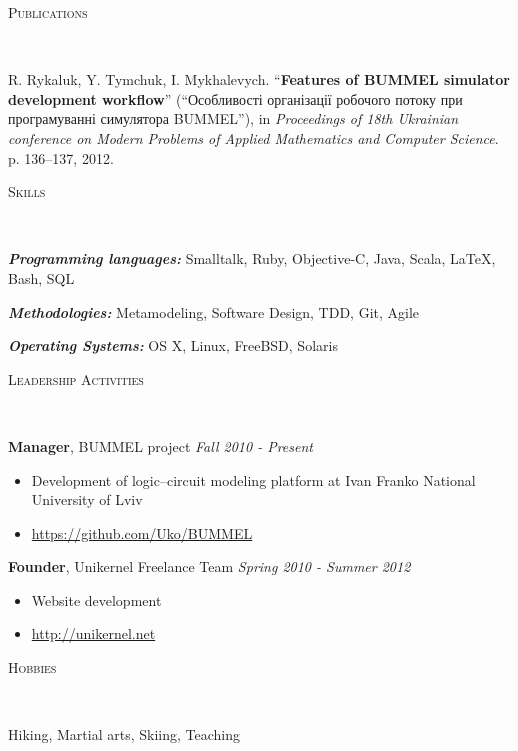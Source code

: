 \documentclass{article}
\newenvironment{changemargin}[2]{%
  \begin{list}{}{%
    \setlength{\topsep}{0pt}%
    \setlength{\leftmargin}{#1}%
    \setlength{\rightmargin}{#2}%
    \setlength{\listparindent}{\parindent}%
    \setlength{\itemindent}{\parindent}%
    \setlength{\parsep}{\parskip}%
  }%
  \item[]}{\end{list}
}
\newcommand{\lineover}{
  \begin{changemargin}{-1mm}{-1mm}
    \vspace*{-8pt}
    \hrulefill \\
    \vspace*{-2pt}
  \end{changemargin}
}
\newcommand{\header}[1]{
  \begin{changemargin}{-12mm}{-12mm}
    \scshape{#1}\\
    \lineover
  \end{changemargin}
}
\newenvironment{body}{
  \vspace*{-16pt}
  \begin{changemargin}{-6mm}{-12mm}
}{
  \end{changemargin}
}
\begin{document}
\smallskip

\header{Publications}

\begin{body}
  \vspace{14pt}
  R. Rykaluk, Y. Tymchuk, I. Mykhalevych. ``\textbf{Features of BUMMEL simulator development workflow}'' (``Особливості організації робочого потоку при програмуванні симулятора BUMMEL''), in \emph{Proceedings of 18th Ukrainian conference on Modern Problems of Applied Mathematics and Computer Science}. p. 136--137, 2012.\\

\end{body}

\smallskip

\header{Skills}

\begin{body}
  \vspace{14pt}
  \emph{\textbf{Programming languages:}}{} Smalltalk, Ruby, Objective-C, Java, Scala, \LaTeX, Bash, SQL
  \medskip
  
  \emph{\textbf{Methodologies:}}{} Metamodeling, Software Design, TDD, Git, Agile
  \medskip
  
  \emph{\textbf{Operating Systems:}}{} OS X, Linux, FreeBSD, Solaris
\end{body}

\smallskip


\header{Leadership Activities}

\begin{body}
  \vspace{14pt}
  \textbf{Manager}, BUMMEL project \hfill{} \emph{Fall 2010 - Present}\\
  \vspace*{-4pt}
  \begin{itemize} \itemsep -0pt
    \item Development of logic--circuit modeling platform at Ivan Franko National University of Lviv 
    \item \url{https://github.com/Uko/BUMMEL}
  \end{itemize}
  \smallskip
  \textbf{Founder}, Unikernel Freelance Team \hfill {} \emph{Spring 2010 - Summer 2012}\\
  \vspace*{-4pt}
  \begin{itemize} \itemsep -0pt
    \item Website development
    \item \url{http://unikernel.net}
  \end{itemize}
\end{body}


\header{Hobbies}
  
  \begin{body}
  \vspace{14pt}
  Hiking, Martial arts, Skiing, Teaching
  \end{body}
\end{document}
